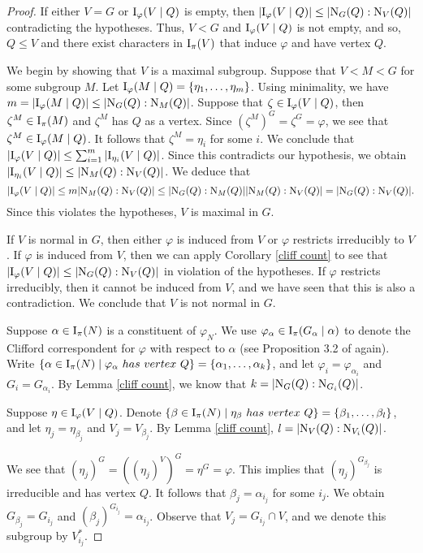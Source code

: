 \documentclass[12pt]{article}
\def\norm#1#2{{\textrm N}_{#1} (#2)}
\def\I#1#2{{\textrm I}_{#1} (#2)}
\def\Ipi#1{\I {\pi}{#1}}
\def\phi{\varphi}
\newcommand \IIpi[3] {{\textrm I}_{#1} (#2 \mid #3)}
\begin{document}
\begin{proof}
If either $V = G$ or $\IIpi {\phi}VQ$ is empty, then $|\IIpi
{\phi}VQ| \le |\norm GQ:\norm VQ|$ contradicting the hypotheses.
Thus, $V < G$ and $\IIpi {\phi}VQ$ is not empty, and so, $Q \le V$
and there exist characters in $\Ipi V$ that induce $\phi$ and have
vertex $Q$.

We begin by showing that $V$ is a maximal subgroup.  Suppose that $V
< M < G$ for some subgroup $M$.  Let $\IIpi {\phi}MQ = \{ \eta_1,
\dots, \eta_m \}$.  Using minimality, we have $m = |\IIpi {\phi}MQ|
\le |\norm GQ:\norm MQ|$. Suppose that $\zeta \in \IIpi {\phi}VQ$,
then $\zeta^M \in \Ipi M$ and $\zeta^M$ has $Q$ as a vertex.  Since
$(\zeta^M)^G = \zeta^G = \phi$, we see that $\zeta^M \in \IIpi
{\phi}MQ$.  It follows that $\zeta^M = \eta_i$ for some $i$.  We
conclude that $|\IIpi {\phi}VQ| \le \sum_{i=1}^m |\IIpi
{\eta_i}VQ|$.  Since this contradicts our hypothesis, we obtain
$|\IIpi {\eta_i}VQ| \le |\norm MQ:\norm VQ|$.  We deduce that
$$
|\IIpi {\phi}VQ| \le m|\norm MQ:\norm VQ| \le
|\norm GQ:\norm MQ||\norm MQ: \norm VQ| = |\norm GQ:\norm VQ|.
$$
Since this violates the hypotheses, $V$ is maximal in $G$.

If $V$ is normal in $G$, then either $\phi$ is induced from $V$ or
$\phi$ restricts irreducibly to $V$.  If $\phi$ is induced from $V$,
then we can apply Corollary \ref{cliff count} to see that $|\IIpi
{\phi}VQ| \le |\norm GQ:\norm VQ|$ in violation of the hypotheses.
If $\phi$ restricts irreducibly, then it cannot be induced from $V$,
and we have seen that this is also a contradiction.  We conclude
that $V$ is not normal in $G$.

Suppose $\alpha \in \Ipi N$ is a constituent of $\phi_N$.  We use
$\phi_\alpha \in \Ipi {G_\alpha \mid \alpha}$ to denote the Clifford
correspondent for $\phi$ with respect to $\alpha$ (see Proposition
3.2 of \cite{Fong} again).   Write $\{ \alpha \in \Ipi N \mid
\phi_\alpha {\textrm ~has~vertex~} Q \} = \{ \alpha_1, \dots, \alpha_k
\}$, and let $\phi_i = \phi_{\alpha_i}$ and $G_i = G_{\alpha_i}$. By
Lemma \ref{cliff count}, we know that $k = |\norm GQ:\norm {G_i}Q|$.

Suppose $\eta \in \IIpi {\phi}VQ$.  Denote $\{ \beta \in \Ipi N \mid
\eta_\beta {\textrm ~has~vertex~} Q \} = \{ \beta_1, \dots, \beta_l \}$,
and let $\eta_j = \eta_{\beta_j}$ and $V_j = V_{\beta_j}$.  By Lemma
\ref{cliff count}, $l = |\norm VQ: \norm {V_i}Q|$.

We see that $(\eta_j)^G = ((\eta_j)^V)^G = \eta^G = \phi$.  This
implies that $(\eta_j)^{G_{\beta_j}}$ is irreducible and has vertex
$Q$.  It follows that $\beta_j = \alpha_{i_j}$ for some $i_j$.  We
obtain $G_{\beta_j} = G_{i_j}$ and $(\beta_j)^{G_{i_j}} =
\alpha_{i_j}$. Observe that $V_j = G_{i_j} \cap V$, and we denote
this subgroup by $V^*_{i_j}$.


\end{proof}
\end{document}
